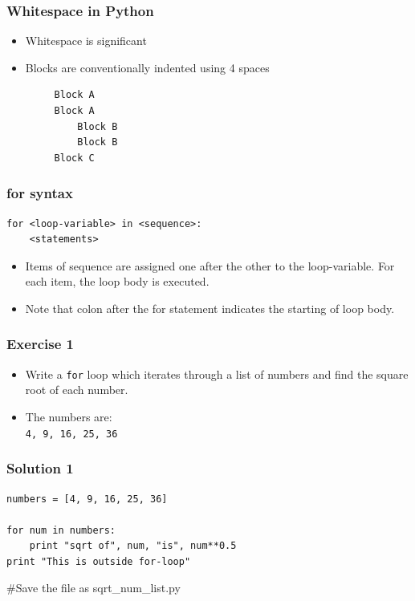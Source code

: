 \documentclass[17pt]{beamer}
\begin{document}
\begin{frame}[fragile]
\frametitle{Whitespace in Python}
\begin{itemize}
\item Whitespace is significant
\item Blocks are conventionally indented using 4 spaces
\begin{verbatim}
     Block A
     Block A
         Block B
         Block B
     Block C
\end{verbatim}
\end{itemize}
\end{frame}
\begin{frame}[fragile]
\frametitle{for syntax}
\lstset{language=Python}
\begin{small}
\begin{lstlisting}
for <loop-variable> in <sequence>:
    <statements>
\end{lstlisting}
\end{small}\pause

\begin{itemize}
\item Items of sequence are assigned one after the other to the loop-variable. \pause For each item, the loop body is executed.
\item Note that colon after the for statement indicates the starting of loop body.
\end{itemize}
\end{frame}
\begin{frame}[fragile]
\frametitle{Exercise 1}
\begin{itemize}
\item Write a \texttt{for} loop which iterates through a list of numbers and find
  the square root of each number.\pause
\item The numbers are: \pause\\
\texttt{4, 9, 16, 25, 36}
\end{itemize}
\end{frame}
\begin{frame}[fragile]
\frametitle{Solution 1}
\lstset{language=Python}

\begin{footnotesize}
\begin{lstlisting}
numbers = [4, 9, 16, 25, 36]

for num in numbers:
    print "sqrt of", num, "is", num**0.5
print "This is outside for-loop"
\end{lstlisting}
\end{footnotesize}
\pause
\#Save the file as sqrt\_num\_list.py
\end{frame}
\end{document}
